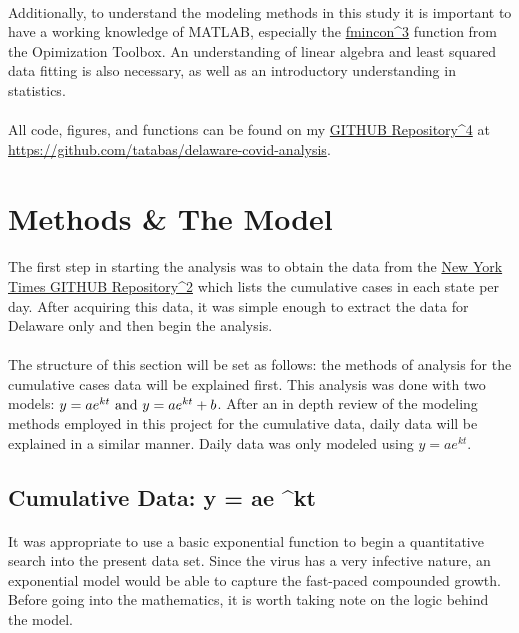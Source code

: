 \documentclass[12pt]{article}
\begin{document}
\paragraph{} Additionally, to understand the modeling methods in this study it is important to have a working knowledge of MATLAB, especially the \href{https://www.mathworks.com/help/optim/ug/fmincon.html}{fmincon^3} function from the Opimization Toolbox. An understanding of linear algebra and least squared data fitting is also necessary, as well as an introductory understanding in statistics.
\paragraph{} All code, figures, and functions can be found on my \href{https://github.com/tatabas/delaware-covid-analysis}{GITHUB Repository^4} at \url{https://github.com/tatabas/delaware-covid-analysis}.

\section{Methods \& The Model}
\paragraph{} The first step in starting the analysis was to obtain the data from the \href{https://github.com/nytimes/covid-19-data/blob/master/us-states.csv}{New York Times GITHUB Repository^2} which lists the cumulative cases in each state per day. After acquiring this data, it was simple enough to extract the data for Delaware only and then begin the analysis.
\paragraph{} The structure of this section will be set as follows: the methods of analysis for the cumulative cases data will be explained first. This analysis was done with two models: $y = ae^{kt} \textnormal{ and } y = ae^{kt} + b$. After an in depth review of the modeling methods employed in this project for the cumulative data, daily data will be explained in a similar manner. Daily data was only modeled using $y = ae^{kt}$.

\subsection{Cumulative Data: y = ae ^{kt}}
\paragraph{} It was appropriate to use a basic exponential function to begin a quantitative search into the present data set. Since the virus has a very infective nature, an exponential model would be able to capture the fast-paced compounded growth. Before going into the mathematics, it is worth taking note on the logic behind the model.
\end{document}
